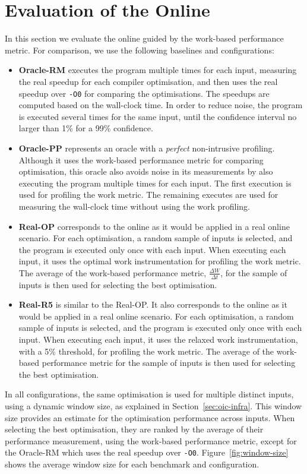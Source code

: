 \section{Evaluation of the Online {\IterComp}}

In this section we evaluate the online {\itercomp} guided by the work-based performance metric.
For comparison, we use the following baselines and configurations:
\begin{itemize}
\item \textbf{Oracle-RM} executes the program multiple times for each input, measuring the real speedup for each compiler optimisation, and then uses the real speedup over \texttt{-O0} for comparing the optimisations.
The speedups are computed based on the wall-clock time.
In order to reduce noise, the program is executed several times for the same input, until the confidence interval no larger than 1\% for a 99\% confidence.
\item \textbf{Oracle-PP} represents an oracle with a \textit{perfect} non-intrusive profiling.
Although it uses the work-based performance metric for comparing optimisation, this oracle also avoids noise in its measurements by also executing the program multiple times for each input.
The first execution is used for profiling the work metric.
The remaining executes are used for measuring the wall-clock time without using the work profiling.
\item \textbf{Real-OP} corresponds to the online {\itercomp} as it would be applied in a real online scenario.
      For each optimisation, a random sample of inputs is selected, and the program is executed only once with each input.
      When executing each input, it uses the optimal work instrumentation for profiling the work metric.
      The average of the work-based performance metric, $\frac{\Delta W}{\Delta t}$, for the sample of inputs is then used for selecting the best optimisation.
\item \textbf{Real-R5} is similar to the {Real-OP}.
      It also corresponds to the online {\itercomp} as it would be applied in a real online scenario.
      For each optimisation, a random sample of inputs is selected, and the program is executed only once with each input.
      When executing each input, it uses the relaxed work instrumentation, with a 5\% threshold, for profiling the work metric.
      The average of the work-based performance metric for the sample of inputs is then used for selecting the best optimisation.
\end{itemize}
In all configurations, the same optimisation is used for multiple distinct inputs, using a dynamic window size, as explained in Section~\ref{sec:oic-infra}.
This window size provides an estimate for the optimisation performance across inputs.
When selecting the best optimisation, they are ranked by the average of their performance measurement, using the work-based performance metric, except for the Oracle-RM which uses the real speedup over \texttt{-O0}.
Figure~\ref{fig:window-size} shows the average window size for each benchmark and configuration.

